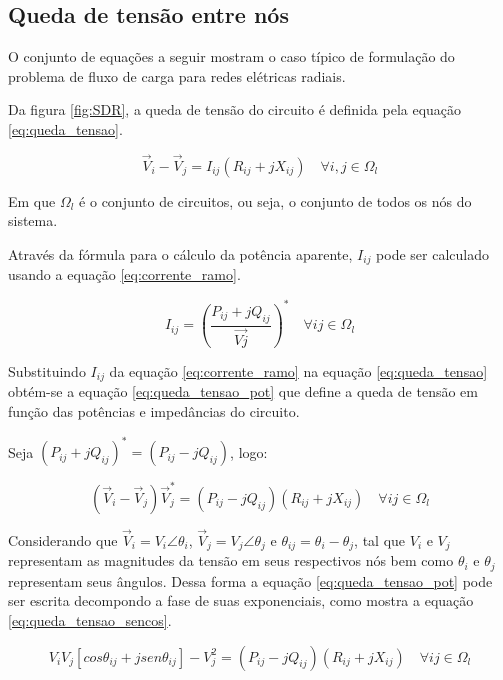 \subsection{Queda de tensão entre nós}


O conjunto de equações a seguir mostram o caso típico de formulação do problema de fluxo de carga para redes elétricas radiais.

Da figura \ref{fig:SDR}, a queda de tensão do circuito é definida pela equação \ref{eq:queda_tensao}.

\begin{equation}
    \Vec{V}_{i} - \Vec{V}_{j} = I_{ij}(R_{ij} + jX_{ij})\quad\forall i,j \in \Omega_{l}
    \label{eq:queda_tensao}
\end{equation}

Em que $\Omega_{l}$ é o conjunto de circuitos, ou seja, o conjunto de todos os nós do sistema.

Através da fórmula para o cálculo da potência aparente, $I_{ij}$ pode ser calculado usando a equação \ref{eq:corrente_ramo}.

\begin{equation}
    I_{ij} = \left(\frac{P_{ij} + jQ_{ij}}{\Vec{Vj}}\right)^{*}\quad\forall ij \in \Omega_{l}
    \label{eq:corrente_ramo}
\end{equation}

Substituindo $I_{ij}$ da equação \ref{eq:corrente_ramo} na equação \ref{eq:queda_tensao} obtém-se a equação \ref{eq:queda_tensao_pot} que define a queda de tensão em função das potências e impedâncias do circuito.


Seja $(P_{ij} + jQ_{ij})^{*} = (P_{ij} - jQ_{ij})$, logo:

\begin{equation}
    (\Vec{V}_{i} - \Vec{V}_{j})\Vec{V}_{j}^{*} = (P_{ij} - jQ_{ij})(R_{ij} + jX_{ij}) \quad\forall ij \in \Omega_{l}
    \label{eq:queda_tensao_pot}
\end{equation}

Considerando que $\Vec{V}_{i} = V_{i}\angle{\theta_{i}}$, $\Vec{V}_{j} = V_{j}\angle{\theta_{j}}$ e $\theta_{ij} = \theta_{i} - \theta_{j}$, tal que  $V_{i}$ e $V_{j}$ representam as magnitudes da tensão em seus respectivos nós bem como $\theta_{i}$ e $\theta_{j}$ representam seus ângulos.
Dessa forma a equação \ref{eq:queda_tensao_pot} pode ser escrita decompondo a fase de suas exponenciais, como mostra a equação \ref{eq:queda_tensao_sencos}.

\begin{equation}\label{eq:queda_tensao_sencos}
    V_{i}V_{j}[cos\theta_{ij} + jsen\theta_{ij}] - V_{j}^{2} = (P_{ij} - jQ_{ij})(R_{ij} + jX_{ij}) \quad\forall ij \in \Omega_{l}
\end{equation}

